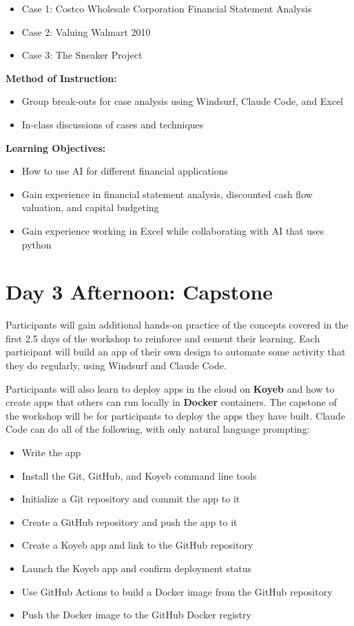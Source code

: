 \documentclass[11pt]{scrartcl}
\begin{document}
\begin{itemize}
\item Case 1: Costco Wholesale Corporation Financial Statement Analysis
\item Case 2: Valuing Walmart 2010
\item Case 3: The Sneaker Project
\end{itemize}

\textbf{Method of Instruction:}

\begin{itemize}
\item Group break-outs for case analysis using Windsurf, Claude Code, and Excel
\item In-class discussions of cases and techniques
\end{itemize}

\textbf{Learning Objectives:}

\begin{itemize}
\item How to use AI for different financial applications
\item Gain experience in financial statement analysis, discounted cash flow valuation, and capital budgeting
\item Gain experience working in Excel while collaborating with AI that uses python 
\end{itemize}

\section*{Day 3 Afternoon: Capstone}

Participants will gain additional hands-on practice of the concepts covered in the first 2.5 days of the workshop to reinforce and cement their learning. Each participant will build an app of their own design to automate some activity that they do regularly, using Windsurf and Claude Code.

Participants will also learn to deploy apps in the cloud on \textbf{Koyeb} and how to create apps that others can run locally in \textbf{Docker} containers. The capstone of the workshop will be for participants to deploy the apps they have built. Claude Code can do all of the following, with only natural language prompting:

\begin{itemize}
\item Write the app
\item Install the Git, GitHub, and Koyeb command line tools
\item Initialize a Git repository and commit the app to it
\item Create a GitHub repository and push the app to it 
\item Create a Koyeb app and link to the GitHub repository
\item Launch the Koyeb app and confirm deployment status
\item Use GitHub Actions to build a Docker image from the GitHub repository
\item Push the Docker image to the GitHub Docker registry
\end{itemize}
\end{document}
